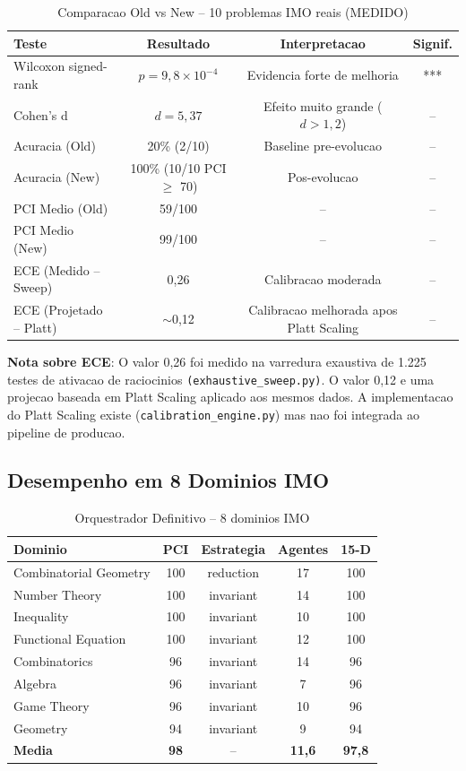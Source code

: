 \documentclass[5p]{elsarticle}
\begin{document}
\begin{table}[H]
 \centering
 \caption{Comparacao Old vs New -- 10 problemas IMO reais (MEDIDO)}
 \label{tab:stats}
 \footnotesize
 \begin{tabular}{lccc}
 \toprule
 \textbf{Teste} & \textbf{Resultado} & \textbf{Interpretacao} & \textbf{Signif.}\\
 \midrule
 Wilcoxon signed-rank & $p = 9,8 \times 10^{-4}$ & Evidencia forte de melhoria & ***\\
 Cohen's d & $d = 5,37$ & Efeito muito grande ($d>1,2$) & --\\
 Acuracia (Old) & 20\% (2/10) & Baseline pre-evolucao & --\\
 Acuracia (New) & 100\% (10/10 PCI $\geq$ 70) & Pos-evolucao & --\\
 PCI Medio (Old) & 59/100 & -- & --\\
 PCI Medio (New) & 99/100 & -- & --\\
 ECE (Medido -- Sweep) & 0,26 & Calibracao moderada & --\\
 ECE (Projetado -- Platt) & $\sim$0,12 & Calibracao melhorada apos Platt Scaling & --\\
 \bottomrule
 \end{tabular}
\end{table}

\textbf{Nota sobre ECE}: O valor 0,26 foi medido na varredura exaustiva de 1.225
testes de ativacao de raciocinios \texttt{(exhaustive\_sweep.py)}. O valor 0,12 e
uma projecao baseada em Platt Scaling \cite{platt1999} aplicado aos mesmos dados.
A implementacao do Platt Scaling existe (\texttt{calibration\_engine.py}) mas nao
foi integrada ao pipeline de producao.

\subsection{Desempenho em 8 Dominios IMO}

\begin{table}[H]
 \centering
 \caption{Orquestrador Definitivo -- 8 dominios IMO}
 \label{tab:domains}
 \footnotesize
 \begin{tabular}{lcccc}
 \toprule
 \textbf{Dominio} & \textbf{PCI} & \textbf{Estrategia} & \textbf{Agentes} & \textbf{15-D}\\
 \midrule
 Combinatorial Geometry & 100 & reduction & 17 & 100\\
 Number Theory & 100 & invariant & 14 & 100\\
 \rowcolor{greenbg} Inequality & 100 & invariant & 10 & 100\\
 Functional Equation & 100 & invariant & 12 & 100\\
 Combinatorics & 96 & invariant & 14 & 96\\
 Algebra & 96 & invariant & 7 & 96\\
 Game Theory & 96 & invariant & 10 & 96\\
 Geometry & 94 & invariant & 9 & 94\\
 \midrule
 \textbf{Media} & \textbf{98} & -- & \textbf{11,6} & \textbf{97,8}\\
 \bottomrule
 \end{tabular}
\end{table}
\end{document}
